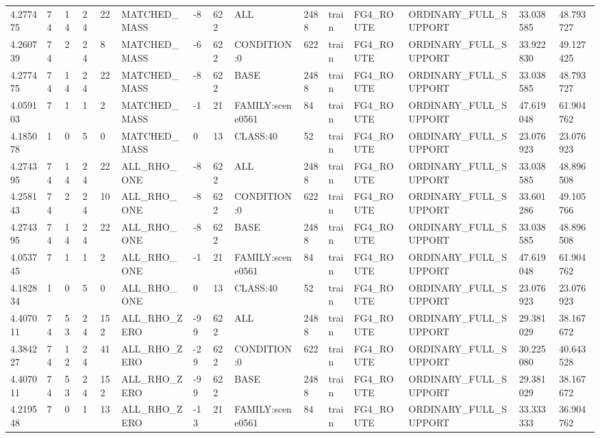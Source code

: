 \begin{tabular}{lllllllllllllll}
4.277475 & 74 & 14 & 24 & 22 & MATCHED\_MASS & -8 & 622 & ALL & 2488 & train & FG4\_ROUTE & ORDINARY\_FULL\_SUPPORT & 33.038585 & 48.793727 \\
4.260739 & 74 & 2 & 24 & 8 & MATCHED\_MASS & -6 & 622 & CONDITION:0 & 622 & train & FG4\_ROUTE & ORDINARY\_FULL\_SUPPORT & 33.922830 & 49.127425 \\
4.277475 & 74 & 14 & 24 & 22 & MATCHED\_MASS & -8 & 622 & BASE & 2488 & train & FG4\_ROUTE & ORDINARY\_FULL\_SUPPORT & 33.038585 & 48.793727 \\
4.059103 & 7 & 1 & 1 & 2 & MATCHED\_MASS & -1 & 21 & FAMILY:scene0561 & 84 & train & FG4\_ROUTE & ORDINARY\_FULL\_SUPPORT & 47.619048 & 61.904762 \\
4.185078 & 1 & 0 & 5 & 0 & MATCHED\_MASS & 0 & 13 & CLASS:40 & 52 & train & FG4\_ROUTE & ORDINARY\_FULL\_SUPPORT & 23.076923 & 23.076923 \\
4.274395 & 74 & 14 & 24 & 22 & ALL\_RHO\_ONE & -8 & 622 & ALL & 2488 & train & FG4\_ROUTE & ORDINARY\_FULL\_SUPPORT & 33.038585 & 48.896508 \\
4.258143 & 74 & 2 & 24 & 10 & ALL\_RHO\_ONE & -8 & 622 & CONDITION:0 & 622 & train & FG4\_ROUTE & ORDINARY\_FULL\_SUPPORT & 33.601286 & 49.105766 \\
4.274395 & 74 & 14 & 24 & 22 & ALL\_RHO\_ONE & -8 & 622 & BASE & 2488 & train & FG4\_ROUTE & ORDINARY\_FULL\_SUPPORT & 33.038585 & 48.896508 \\
4.053745 & 7 & 1 & 1 & 2 & ALL\_RHO\_ONE & -1 & 21 & FAMILY:scene0561 & 84 & train & FG4\_ROUTE & ORDINARY\_FULL\_SUPPORT & 47.619048 & 61.904762 \\
4.182834 & 1 & 0 & 5 & 0 & ALL\_RHO\_ONE & 0 & 13 & CLASS:40 & 52 & train & FG4\_ROUTE & ORDINARY\_FULL\_SUPPORT & 23.076923 & 23.076923 \\
4.407011 & 74 & 53 & 24 & 152 & ALL\_RHO\_ZERO & -99 & 622 & ALL & 2488 & train & FG4\_ROUTE & ORDINARY\_FULL\_SUPPORT & 29.381029 & 38.167672 \\
4.384227 & 74 & 12 & 24 & 41 & ALL\_RHO\_ZERO & -29 & 622 & CONDITION:0 & 622 & train & FG4\_ROUTE & ORDINARY\_FULL\_SUPPORT & 30.225080 & 40.643528 \\
4.407011 & 74 & 53 & 24 & 152 & ALL\_RHO\_ZERO & -99 & 622 & BASE & 2488 & train & FG4\_ROUTE & ORDINARY\_FULL\_SUPPORT & 29.381029 & 38.167672 \\
4.219548 & 7 & 0 & 1 & 13 & ALL\_RHO\_ZERO & -13 & 21 & FAMILY:scene0561 & 84 & train & FG4\_ROUTE & ORDINARY\_FULL\_SUPPORT & 33.333333 & 36.904762 \\

\end{tabular}
